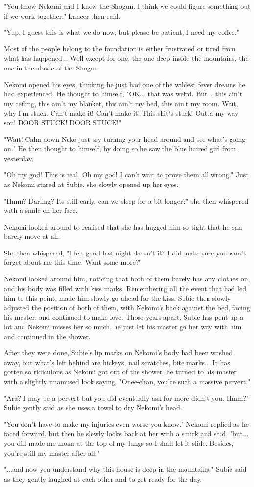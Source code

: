 "You know Nekomi and I know the Shogun. I think we could figure something out if we work together." Lancer then said. 

"Yup, I guess this is what we do now, but please be patient, I need my coffee."

Most of the people belong to the foundation is either frustrated or tired from what has happened... Well except for one, the one deep inside the mountains, the one in the abode of the Shogun. 

Nekomi opened his eyes, thinking he just had one of the wildest fever dreams he had experienced. He thought to himself, "OK... that was weird. But... this ain't my ceiling, this ain't my blanket, this ain't my bed, this ain't my room. Wait, why I'm stuck. Can't make it! Can't make it! This shit's stuck! Outta my way son! DOOR STUCK! DOOR STUCK!"

"Wait! Calm down Neko just try turning your head around and see what's going on." He then thought to himself, by doing so he saw the blue haired girl from yesterday. 

"Oh my god! This is real. Oh my god! I can't wait to prove them all wrong." Just as Nekomi stared at Subie, she slowly opened up her eyes. 

"Hmm? Darling? Its still early, can we sleep for a bit longer?" she then whispered with a smile on her face. 

Nekomi looked around to realised that she has hugged him so tight that he can barely move at all. 

She then whispered, "I felt good last night doesn't it? I did make sure you won't forget about me this time. Want some more?"

Nekomi looked around him, noticing that both of them barely has any clothes on, and his body was filled with kiss marks. Remembering all the event that had led him to this point, made him slowly go ahead for the kiss. Subie then slowly adjusted the position of both of them, with Nekomi's back against the bed, facing his master, and continued to make love. Those years apart, Subie has pent up a lot and Nekomi misses her so much, he just let his master go her way with him and continued in the shower.

After they were done, Subie's lip marks on Nekomi's body had been washed away, but what's left behind are hickeys, nail scratches, bite marks... It has gotten so ridiculous as Nekomi got out of the shower, he turned to his master with a slightly unamused look saying, "Onee-chan, you're such a massive pervert."

"Ara? I may be a pervert but you did eventually ask for more didn't you. Hmm?" Subie gently said as she uses a towel to dry Nekomi's head. 

"You don't have to make my injuries even worse you know." Nekomi replied as he faced forward, but then he slowly looks back at her with a smirk and said, "but... you did made me moan at the top of my lungs so I shall let it slide. Besides, you're still my master after all."

"...and now you understand why this house is deep in the mountains." Subie said as they gently laughed at each other and to get ready for the day.


